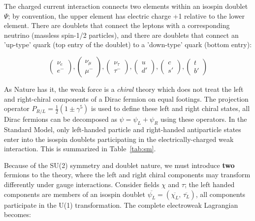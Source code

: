 The charged current interaction connects two elements within an isospin doublet $\Psi$; by convention, the upper element has electric charge +1 relative to the lower element. There are doublets that connect the leptons with a corresponding neutrino (massless spin-1/2 particles), and there are doublets that connect an 'up-type' quark (top entry of the doublet) to a 'down-type' quark (bottom entry):

\begin{equation*}
\begin{pmatrix} \nu_{e} \\ e^{-} \end{pmatrix},
\begin{pmatrix} \nu_{\mu} \\ \mu^{-} \end{pmatrix},
\begin{pmatrix} \nu_{\tau} \\ \tau^{-} \end{pmatrix},
\begin{pmatrix} u \\ d' \end{pmatrix},
\begin{pmatrix} c \\ s' \end{pmatrix},
\begin{pmatrix} t \\ b' \end{pmatrix}
\end{equation*}

As Nature has it, the weak force is a \textit{chiral} theory which does not treat the left and right-chiral components of a Dirac fermion on equal footings.  The projection operator $P_{R/L} = \frac{1}{2} ( 1 \pm \gamma^{5})$ is used to define these left and right chiral states, all Dirac fermions can be decomposed as $\psi = \psi_{L} + \psi_{R}$ using these operators. In the Standard Model, only left-handed particle and right-handed antiparticle states enter into the isospin doublets participating in the electrically-charged weak interaction. This is summarized in Table~\ref{tab:sm}.

Because of the SU(2) symmetry and doublet nature, we must introduce \textbf{two} fermions to the theory, where the left and right chiral components may transform differently under gauge interactions. Consider fields  $\chi$ and  $\tau$; the left handed components are members of an isospin doublet $\overline{\psi_{L}}=(\overline{\chi_{L}},\,\overline{\tau_{L}})$, all components participate in the U(1) transformation. The complete electroweak Lagrangian becomes:

